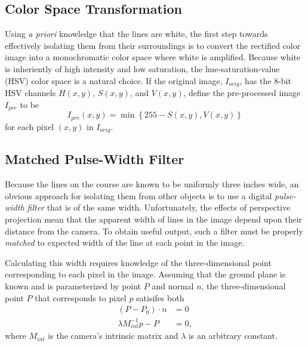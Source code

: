 \documentclass[11pt,twocolumn]{article}
\begin{document}
\subsection{Color Space Transformation}
Using \textit{a priori} knowledge that the lines are white, the first step
towards effectively isolating them from their surroundings is to convert the
rectified color image into a monochromatic color space where white is
amplified. Because white is inheriently of high intensity and low saturation,
the hue-saturation-value (HSV) color space is a natural choice. If the original
image, $I_{orig}$, has the 8-bit HSV channels $H(x,y)$, $S(x, y)$, and $V(x,
y)$, define the pre-processed image $I_{pre}$ to be
\begin{equation*}
	I_{pre}(x, y) = \min\left\{255 - S(x, y), V(x, y)\right\}
\end{equation*}
for each pixel $(x, y)$ in $I_{orig}$.

\subsection{Matched Pulse-Width Filter}
Because the lines on the course are known to be uniformly three inches wide, an
obvious approach for isolating them from other objects is to use a digital
\textit{pulse-width filter} that is of the same width. Unfortunately, the
effects of perspective projection mean that the apparent width of lines in the
image depend upon their distance from the camera. To obtain useful output, such
a filter must be properly \textit{matched} to expected width of the line at
each point in the image.

Calculating this width requires knowledge of the three-dimensional point
corresponding to each pixel in the image. Assuming that the ground plane is
known and is parameterized by point $P$ and normal $n$, the three-dimensional
point $P$ that corresponds to pixel $p$ satisifes both
\begin{align*}
	(P - P_0) \cdot n     &= 0 \\
	\lambda M^{-1}_{int} p - P &= 0,
\end{align*}
where $M_{int}$ is the camera's intrinsic matrix and $\lambda$ is an arbitrary
constant.
\end{document}
